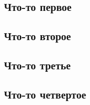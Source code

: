\subsection{Что-то первое}
\subsection{Что-то второе}
\subsection{Что-то третье}
\subsection{Что-то четвертое}
